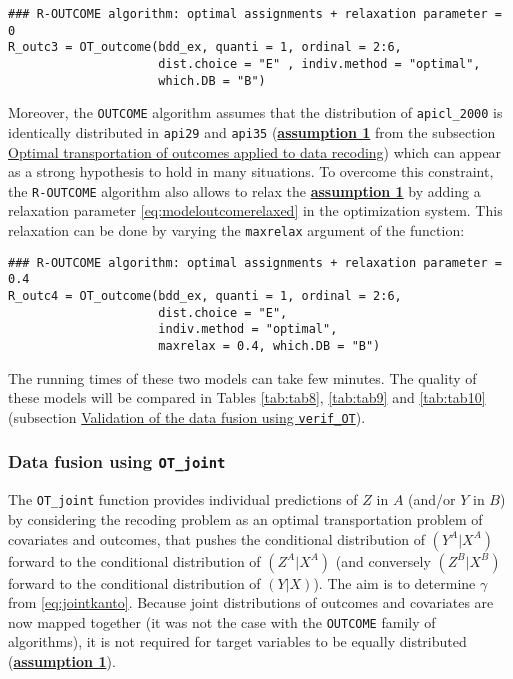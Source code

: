 \begin{verbatim}
### R-OUTCOME algorithm: optimal assignments + relaxation parameter = 0
R_outc3 = OT_outcome(bdd_ex, quanti = 1, ordinal = 2:6, 
                     dist.choice = "E" , indiv.method = "optimal",
                     which.DB = "B")
\end{verbatim}

Moreover, the \texttt{OUTCOME} algorithm assumes that the distribution of \texttt{apicl\_2000} is identically distributed in \texttt{api29} and \texttt{api35} (\protect\hyperlink{optt}{\textbf{assumption 1}} from the subsection \protect\hyperlink{optt}{Optimal transportation of outcomes applied to data recoding}) which can appear as a strong hypothesis to hold in many situations. To overcome this constraint, the \texttt{R-OUTCOME} algorithm also allows to relax the \protect\hyperlink{optt}{\textbf{assumption 1}} by adding a relaxation parameter \eqref{eq:modeloutcomerelaxed} in the optimization system. This relaxation can be done by varying the \texttt{maxrelax} argument of the function:

\begin{verbatim}
### R-OUTCOME algorithm: optimal assignments + relaxation parameter = 0.4
R_outc4 = OT_outcome(bdd_ex, quanti = 1, ordinal = 2:6, 
                     dist.choice = "E",
                     indiv.method = "optimal", 
                     maxrelax = 0.4, which.DB = "B")
\end{verbatim}

The running times of these two models can take few minutes. The quality of these models will be compared in Tables \ref{tab:tab8}, \ref{tab:tab9} and \ref{tab:tab10} (subsection \protect\hyperlink{vodf}{Validation of the data fusion using \texttt{verif\_OT}}).

\hypertarget{data-fusion-using-ot_joint}{%
\subsubsection{\texorpdfstring{Data fusion using \texttt{OT\_joint}}{Data fusion using OT\_joint}}\label{data-fusion-using-ot_joint}}

The \texttt{OT\_joint} function provides individual predictions of \(Z\) in \(A\) (and/or \(Y\) in \(B\)) by considering the recoding problem as an optimal transportation problem of covariates and outcomes, that pushes the conditional distribution of \((Y^A|X^A)\) forward to the conditional distribution of \((Z^A|X^A)\) (and conversely \((Z^B|X^B)\) forward to the conditional distribution of \((Y|X)\)). The aim is to determine \(\gamma\) from \eqref{eq:jointkanto}. Because joint distributions of outcomes and covariates are now mapped together (it was not the case with the \texttt{OUTCOME} family of algorithms), it is not required for target variables to be equally distributed (\protect\hyperlink{optt}{\textbf{assumption 1}}).

